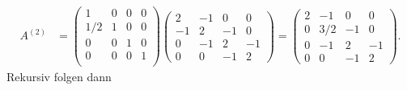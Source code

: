 \documentclass[english, parskip=full]{scrartcl}
\begin{document}
\begin{align}
A^{(2)} &=  \begin{pmatrix}
1 & 0 & 0 & 0 \\
1/2 & 1 & 0 & 0 \\
0 & 0 & 1 & 0 \\
0 & 0 & 0 & 1 \\
\end{pmatrix}\begin{pmatrix}
2 & -1 & 0 & 0 \\
-1 & 2 & -1 & 0 \\
0 & -1 & 2 & -1 \\
0 & 0 & -1 & 2
\end{pmatrix} = \begin{pmatrix}
2 & -1 & 0 & 0 \\
0 & 3/2 & -1 & 0 \\
0 & -1 & 2 & -1 \\
0 & 0 & -1 & 2
\end{pmatrix}.
\end{align}
Rekursiv folgen dann
\end{document}
